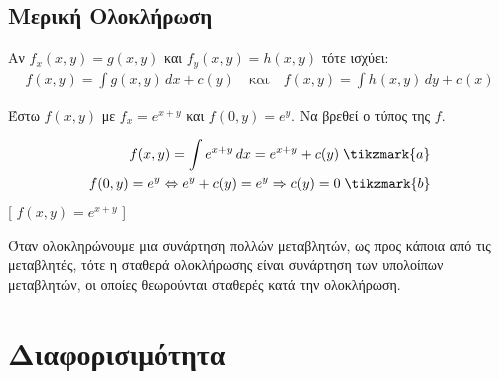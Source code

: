 \section{Μερική Ολοκλήρωση}

\begin{rem}
\item {}
    Αν $ f_{x}(x,y) = g(x,y)$ και $ f_{y}(x,y)=h(x,y) $ τότε ισχύει:
    \begin{align*}
        f(x,y) = \int g(x,y) \,{dx} + c(y) \quad \text{και} \quad f(x,y) = 
        \int h(x,y) \,{dy} + c(x) 
    \end{align*} 
\end{rem}

\begin{example}
\item {}
    Έστω $ f(x,y)$ με $ f_{x}=e^{x+y} $ και $ f(0,y)=e^{y} $. Να βρεθεί ο τύπος της $f$.
    \begin{solution}
        \begin{align*}
            f(x,y) = \int e^{x+y} \,{dx} = e^{x+y} + c(y) \; \tikzmark{a} \\ 
            f(0,y) = e^{y} \Leftrightarrow e^{y}+ c(y) = e^{y} \Rightarrow c(y) = 0 
            \; \tikzmark{b}
        \end{align*}
        [ $f(x,y) = e^{x+y}$ ]
    \end{solution}
\end{example}

\begin{rem}
    Όταν ολοκληρώνουμε μια συνάρτηση πολλών μεταβλητών, ως προς κάποια από τις 
    μεταβλητές, τότε η σταθερά ολοκλήρωσης είναι συνάρτηση των υπολοίπων μεταβλητών, 
    οι οποίες θεωρούνται σταθερές κατά την ολοκλήρωση.
\end{rem}


\chapter{Διαφορισιμότητα}

